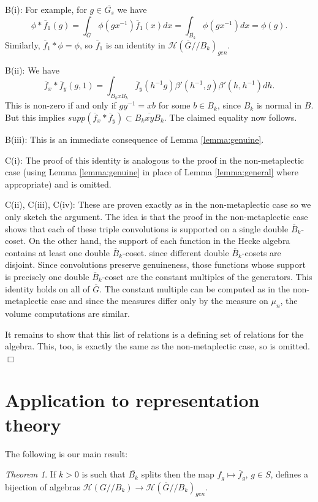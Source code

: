 \documentclass[12pt,letterpaper]{amsart}
\theoremstyle{definition}
\theoremstyle{remark}
\newtheorem{theorem}{Theorem}
\begin{document}
B(i): For example, for $g\in \overline{G_s}$ we have
\[
\phi*\overline{f}_1(g)=\int_{\overline{G}}\phi(gx^{-1})\overline{f}_1(x)dx
=\int_{\overline{B_k}}\phi(gx^{-1})dx
=\phi(g).
\]
Similarly, $\overline{f}_1*\phi=\phi$, so $\overline{f}_1$ is an 
identity in $\mathcal{H}(\overline{G}//B_k)_{gen}$.

B(ii): We have
\[
\overline{f}_x*\overline{f}_y(g,1)
=\int_{B_kxB_k}
\overline{f}_{y}(h^{-1}g)
\beta'(h^{-1},g)\beta'(h,h^{-1})dh.
\]
This is non-zero if and only if $gy^{-1}=xb$ for some 
$b\in B_k$,
since $B_k$ is normal in $B$. But this implies
$supp(\overline{f}_x*\overline{f}_y)\subset 
\overline{B_kxyB_k}$. The claimed equality now follows.

B(iii): This is an immediate consequence of Lemma
\ref{lemma:genuine}.

C(i): The proof of this identity is analogous to the
proof in the non-metaplectic case (using Lemma
\ref{lemma:genuine} in place of Lemma \ref{lemma:general}
where appropriate) and is omitted.

C(ii), C(iii), C(iv): These are proven exactly as in
the non-metaplectic case so we only
sketch the argument. The idea is that
the proof in the non-metaplectic case shows that each of these
triple convolutions is supported on a single 
double $\overline{B}_k$-coset. On the other hand, the
support of each function in the Hecke algebra 
contains at least one double $\overline{B}_k$-coset.
since different double $\overline{B}_k$-cosets are
disjoint. Since convolutions preserve genuineness,
those functions whose support is precisely
one double $\overline{B}_k$-coset are the constant multiples of
the generators. This identity holds on all of
$\overline{G}$. The constant multiple can be computed as 
in the non-metaplectic case and since the measures
differ only by the measure on $\mu_n$,
the volume computations are similar. 

It remains to show that this list of relations is a 
defining set of relations for the algebra. This, too, is
exactly the same as the non-metaplectic case,
so is omitted.              $\Box$


\section{Application to representation theory}

The following is our main result:

\begin{theorem} 
\label{thrm:main}
If $k>0$ is such that $\overline{B_k}$ splits
then the map $f_{g}\longmapsto \overline{f}_{g}$, $g\in S$,
defines a bijection of algebras
$\mathcal{H}(G//B_k)\rightarrow \mathcal{H}(\overline{G}//B_k)_{gen}$.
\end{theorem}
\end{document}
